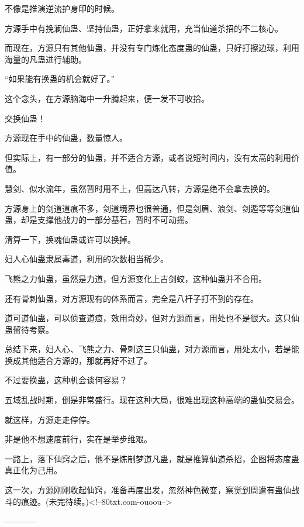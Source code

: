 \begin{this_body}
不像是推演逆流护身印的时候。

方源手中有挽澜仙蛊、坚持仙蛊，正好拿来就用，充当仙道杀招的不二核心。

而现在，方源只有其他仙蛊，并没有专门炼化态度蛊的仙蛊，只好打擦边球，利用海量的凡蛊进行辅助。

“如果能有换蛊的机会就好了。”

这个念头，在方源脑海中一升腾起来，便一发不可收拾。

交换仙蛊！

方源现在手中的仙蛊，数量惊人。

但实际上，有一部分的仙蛊，并不适合方源，或者说短时间内，没有太高的利用价值。

慧剑、似水流年，虽然暂时用不上，但高达八转，方源是绝不会拿去换的。

方源身上的剑道道痕不多，剑道境界也很普通，但是剑眉、浪剑、剑遁等等剑道仙蛊，却是支撑他战力的一部分基石，暂时不可动摇。

清算一下，换魂仙蛊或许可以换掉。

妇人心仙蛊隶属毒道，利用的次数相当稀少。

飞熊之力仙蛊，虽然是力道，但方源变化上古剑蛟，这种仙蛊并不合用。

还有骨刺仙蛊，对方源现有的体系而言，完全是八杆子打不到的存在。

道可道仙蛊，可以侦查道痕，效用奇妙，但对方源而言，用处也不是很大。这只仙蛊留待考察。

总结下来，妇人心、飞熊之力、骨刺这三只仙蛊，对方源而言，用处太小，若是能换成其他适合方源的，那就再好不过了。

不过要换蛊，这种机会谈何容易？

五域乱战时期，倒是非常盛行。现在这种大局，很难出现这种高端的蛊仙交易会。

就这样，方源走走停停。

非是他不想速度前行，实在是举步维艰。

一路上，落下仙窍之后，他不是炼制梦道凡蛊，就是推算仙道杀招，企图将态度蛊真正化为己用。

这一次，方源刚刚收起仙窍，准备再度出发，忽然神色微变，察觉到周遭有蛊仙战斗的痕迹。(未完待续。)<!--80txt.com-ouoou-->

------------

\end{this_body}

